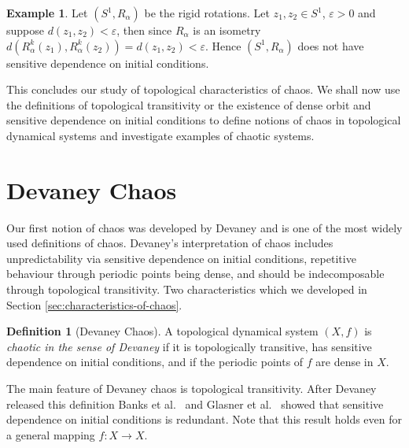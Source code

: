 \documentclass[11pt,a4paper,oneside]{memoir}
\theoremstyle{plain}
\theoremstyle{definition}
\newtheorem{defn}[thm]{Definition}
\newtheorem{exmp}[thm]{Example}
\begin{document}
\begin{exmp} \label{exmp:rigid-rotations-not-sensitive}
    Let $(S^1, R_\alpha)$ be the rigid rotations. Let $z_1,z_2 \in S^1$, $\varepsilon > 0$ and suppose $d(z_1, z_2) < \varepsilon$, then since $R_\alpha$ is an isometry $d(R_\alpha^k(z_1), R_\alpha^k(z_2)) = d(z_1, z_2) < \varepsilon$. Hence $(S^1, R_\alpha)$ does not have sensitive dependence on initial conditions.
\end{exmp}

This concludes our study of topological characteristics of chaos. We shall now use the definitions of topological transitivity or the existence of dense orbit and sensitive dependence on initial conditions to define notions of chaos in topological dynamical systems and investigate examples of chaotic systems.

\section{Devaney Chaos} \label{sec:devaney-chaos}

Our first notion of chaos was developed by Devaney \cite{devaney} and is one of the most widely used definitions of chaos. Devaney's interpretation of chaos includes unpredictability via sensitive dependence on initial conditions, repetitive behaviour through periodic points being dense, and should be indecomposable through topological transitivity. Two characteristics which we developed in Section \ref{sec:characteristics-of-chaos}.

\begin{defn} [Devaney Chaos] \label{defn:devaney-chaos}
    A topological dynamical system $(X, f)$ is \emph{chaotic in the sense of Devaney} if it is topologically transitive, has sensitive dependence on initial conditions, and if the periodic points of $f$ are dense in $X$.
\end{defn}

The main feature of Devaney chaos is topological transitivity. After Devaney released this definition Banks et al.\ \cite{bbcds} and Glasner et al.\ \cite{glasner-weiss} showed that sensitive dependence on initial conditions is redundant. Note that this result holds even for a general mapping $f: X \to X$.
\end{document}
